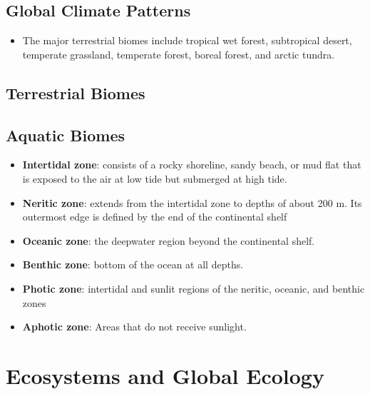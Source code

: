 \documentclass[12pt,a4paper]{article}
\begin{document}
\subsection{Global Climate Patterns}
    \begin{itemize}
        \item The major terrestrial biomes include tropical wet forest, subtropical desert, temperate grassland, temperate forest, boreal forest, and arctic tundra.
    \end{itemize}
\subsection{Terrestrial Biomes}

\subsection{Aquatic Biomes}
\begin{itemize}
    \item \textbf{Intertidal zone}: consists of a rocky shoreline, sandy beach, or mud flat that is exposed to the air at low tide but submerged at high tide. 
    \item \textbf{Neritic zone}: extends from the intertidal zone to depths of about 200 m. Its outermost edge is defined by the end of the continental shelf 
    \item \textbf{Oceanic zone}: the deepwater region beyond the continental shelf. 
    \item \textbf{Benthic zone}: bottom of the ocean at all depths. \item \textbf{Photic zone}: intertidal and sunlit regions of the neritic, oceanic, and benthic zones
    \item \textbf{Aphotic zone}: Areas that do not receive sunlight.
\end{itemize}


\setcounter{section}{52}
\clearpage
\section{Ecosystems and Global Ecology}
\end{document}
